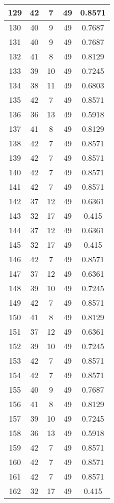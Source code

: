\documentclass[letterpaper, 12pt]{article}
\begin{document}
\begin{longtable}{|c|c|c|c|c|}
\hline
129 & 42 & 7 & 49 & 0.8571 \\
\hline
130 & 40 & 9 & 49 & 0.7687 \\
\hline
131 & 40 & 9 & 49 & 0.7687 \\
\hline
132 & 41 & 8 & 49 & 0.8129 \\
\hline
133 & 39 & 10 & 49 & 0.7245 \\
\hline
134 & 38 & 11 & 49 & 0.6803 \\
\hline
135 & 42 & 7 & 49 & 0.8571 \\
\hline
136 & 36 & 13 & 49 & 0.5918 \\
\hline
137 & 41 & 8 & 49 & 0.8129 \\
\hline
138 & 42 & 7 & 49 & 0.8571 \\
\hline
139 & 42 & 7 & 49 & 0.8571 \\
\hline
140 & 42 & 7 & 49 & 0.8571 \\
\hline
141 & 42 & 7 & 49 & 0.8571 \\
\hline
142 & 37 & 12 & 49 & 0.6361 \\
\hline
143 & 32 & 17 & 49 & 0.415 \\
\hline
144 & 37 & 12 & 49 & 0.6361 \\
\hline
145 & 32 & 17 & 49 & 0.415 \\
\hline
146 & 42 & 7 & 49 & 0.8571 \\
\hline
147 & 37 & 12 & 49 & 0.6361 \\
\hline
148 & 39 & 10 & 49 & 0.7245 \\
\hline
149 & 42 & 7 & 49 & 0.8571 \\
\hline
150 & 41 & 8 & 49 & 0.8129 \\
\hline
151 & 37 & 12 & 49 & 0.6361 \\
\hline
152 & 39 & 10 & 49 & 0.7245 \\
\hline
153 & 42 & 7 & 49 & 0.8571 \\
\hline
154 & 42 & 7 & 49 & 0.8571 \\
\hline
155 & 40 & 9 & 49 & 0.7687 \\
\hline
156 & 41 & 8 & 49 & 0.8129 \\
\hline
157 & 39 & 10 & 49 & 0.7245 \\
\hline
158 & 36 & 13 & 49 & 0.5918 \\
\hline
159 & 42 & 7 & 49 & 0.8571 \\
\hline
160 & 42 & 7 & 49 & 0.8571 \\
\hline
161 & 42 & 7 & 49 & 0.8571 \\
\hline
162 & 32 & 17 & 49 & 0.415 \\

\end{longtable}
\end{document}
